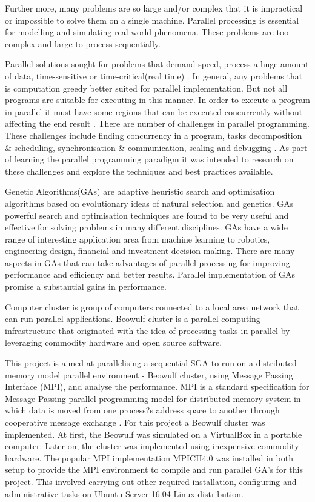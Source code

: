 Further more, many problems are so large and/or complex that  it is impractical or impossible to solve them on a single machine. Parallel processing is essential for modelling and simulating real world phenomena. These problems are too complex and large to process sequentially.

Parallel solutions sought for problems that demand speed, process a huge amount of data, time-sensitive or time-critical(real time) \citep{Barney:16}. In general, any problems that is computation greedy better suited for parallel implementation. But not all programs are suitable for executing in this manner. In order to execute a program in parallel it must have some regions that can be executed concurrently without affecting the end result \citep{Sutter:05}. There are number of challenges in parallel programming. These challenges include finding concurrency in a program, tasks decomposition \& scheduling, synchronisation \& communication, scaling and debugging \citep{Sutter:05}  . As part of learning the parallel programming paradigm it was intended to research on these challenges and explore the techniques and best practices available.

Genetic Algorithms(GAs) are adaptive heuristic search and optimisation algorithms based on evolutionary ideas of natural selection and genetics\citep{Goldberg:89}. GAs powerful search and optimisation techniques are found to be very useful and effective for solving problems in many different disciplines. GAs have a wide range of interesting application area from machine learning to robotics, engineering design, financial and investment decision making\citep{konfrst:04para}. There are many aspects in GAs that can take advantages of parallel processing for improving performance and efficiency and better results. Parallel implementation of GAs promise a substantial gains in performance\citep{cantu:98}.

Computer cluster is group of computers connected to a local area network that can run parallel applications\citep{Gropp:beowulf}. Beowulf cluster is a parallel computing infrastructure that originated with the idea of processing tasks in parallel by leveraging commodity hardware and open source software\citep{Beowulf.org}.
 
This project is aimed at parallelising a sequential SGA to run on a distributed-memory model parallel environment - Beowulf cluster, using Message Passing Interface (MPI), and analyse the performance. MPI is a standard specification for Message-Passing parallel programming model for distributed-memory system in which data is moved from one process?s address space to another through cooperative message exchange \citep{Gropp:99}. For this project a Beowulf cluster was implemented. At first, the Beowulf was simulated on a VirtualBox in a portable computer. Later on, the cluster was implemented using inexpensive commodity hardware. The popular MPI implementation MPICH4.0 was installed in both setup to provide the MPI environment to compile and run parallel GA's for this project. This involved carrying out other required installation, configuring and administrative tasks on Ubuntu Server 16.04 Linux distribution.

